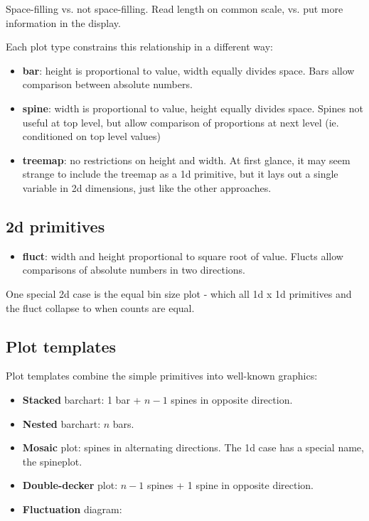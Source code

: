 \documentclass[letterpaper,oneside]{scrartcl}
\begin{document}
Space-filling vs. not space-filling.  Read length on common scale, vs. put more information in the display.

Each plot type constrains this relationship in a different way:

\begin{itemize}
  \item {\bf bar}: height is proportional to value, width equally divides space. Bars allow comparison between absolute numbers.

  \item {\bf spine}: width is proportional to value, height equally divides space. Spines not useful at top level, but allow comparison of proportions at next level (ie. conditioned on top level values)

  \item {\bf treemap}: no restrictions on height and width.   At first glance, it may seem strange to include the treemap as a 1d primitive, but it lays out a single variable in 2d dimensions, just like the other approaches.

\end{itemize}

\subsection{2d primitives}


\begin{itemize}
  \item {\bf fluct}: width and height proportional to square root of value. Flucts allow comparisons of absolute numbers in two directions. 
  
\end{itemize}

One special 2d case is the equal bin size plot - which all 1d x 1d primitives and the fluct collapse to when counts are equal. 


\subsection{Plot templates}

Plot templates combine the simple primitives into well-known graphics:

\begin{itemize}
  \item {\bf Stacked} barchart: 1 bar + $n-1$ spines in opposite direction.
  \item {\bf Nested} barchart: $n$ bars.
  \item {\bf Mosaic} plot: spines in alternating directions.  The 1d case has a special name, the spineplot.
  \item {\bf Double-decker} plot: $n-1$ spines + 1 spine in opposite direction.
  
  \item {\bf Fluctuation} diagram: 
\end{itemize}
\end{document}
